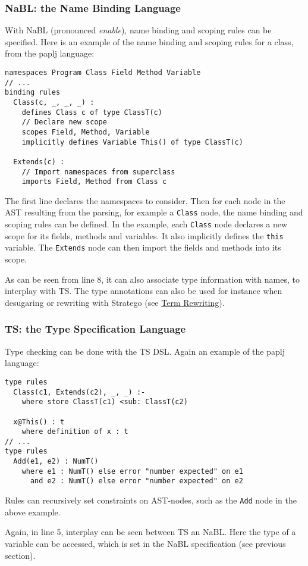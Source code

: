 \subsubsection{NaBL: the Name Binding Language}
\label{sec:orgheadline3}
With NaBL (pronounced \emph{enable}), name binding and scoping rules can be
specified. Here is an example of the name binding and scoping rules
for a class, from the paplj language:
\begin{verbatim}
namespaces Program Class Field Method Variable
// ...
binding rules
  Class(c, _, _, _) :
    defines Class c of type ClassT(c)
    // Declare new scope
    scopes Field, Method, Variable
    implicitly defines Variable This() of type ClassT(c)

  Extends(c) :
    // Import namespaces from superclass
    imports Field, Method from Class c
\end{verbatim}
The first line declares the namespaces to
consider. Then for each node in the AST resulting from the parsing,
for example a \texttt{Class} node, the name binding and scoping rules can be
defined. In the example, each \texttt{Class} node declares a new scope for
its fields, methods and variables. It also implicitly defines the
\texttt{this} variable. The \texttt{Extends} node can then import the fields and
methods into its scope.

As can be seen from line 8, it can also associate type information
with names, to interplay with TS. The type annotations can also be
used for instance when desugaring or rewriting with Stratego (see \hyperref[sec-term-rewrite]{Term
Rewriting}).
\subsubsection{TS: the Type Specification Language}
\label{sec:orgheadline4}
Type checking can be done with the TS DSL. Again an example of the
paplj language:
\begin{verbatim}
type rules
  Class(c1, Extends(c2), _, _) :-
    where store ClassT(c1) <sub: ClassT(c2)

  x@This() : t
    where definition of x : t
// ...
type rules
  Add(e1, e2) : NumT()
    where e1 : NumT() else error "number expected" on e1
      and e2 : NumT() else error "number expected" on e2
\end{verbatim}
Rules can recursively set constraints on AST-nodes, such as the \texttt{Add}
node in the above example.

Again, in line 5, interplay can be seen between TS an NaBL. Here the
type of a variable can be accessed, which is set in the NaBL
specification (see previous section).
